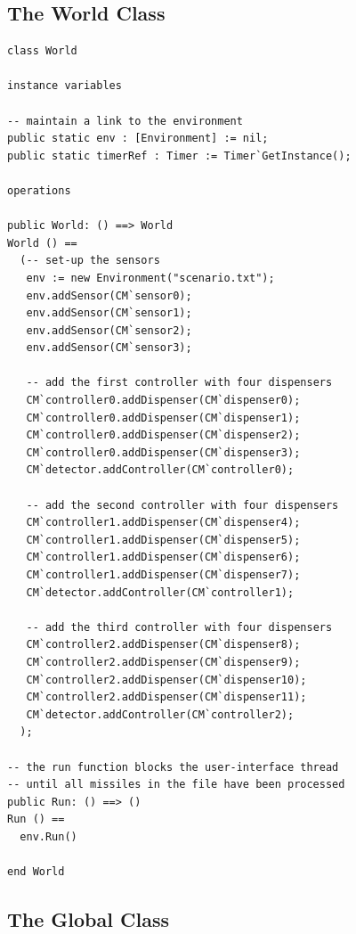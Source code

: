 \documentclass{overturerepchap}
\begin{document}
\subsection{The World Class}

\begin{lstlisting}
class World

instance variables
  
-- maintain a link to the environment
public static env : [Environment] := nil;
public static timerRef : Timer := Timer`GetInstance();

operations

public World: () ==> World
World () ==
  (-- set-up the sensors
   env := new Environment("scenario.txt");
   env.addSensor(CM`sensor0);
   env.addSensor(CM`sensor1);
   env.addSensor(CM`sensor2);
   env.addSensor(CM`sensor3);

   -- add the first controller with four dispensers
   CM`controller0.addDispenser(CM`dispenser0);
   CM`controller0.addDispenser(CM`dispenser1);
   CM`controller0.addDispenser(CM`dispenser2);
   CM`controller0.addDispenser(CM`dispenser3);
   CM`detector.addController(CM`controller0);

   -- add the second controller with four dispensers
   CM`controller1.addDispenser(CM`dispenser4);
   CM`controller1.addDispenser(CM`dispenser5);
   CM`controller1.addDispenser(CM`dispenser6);
   CM`controller1.addDispenser(CM`dispenser7);
   CM`detector.addController(CM`controller1);
 
   -- add the third controller with four dispensers
   CM`controller2.addDispenser(CM`dispenser8);
   CM`controller2.addDispenser(CM`dispenser9);
   CM`controller2.addDispenser(CM`dispenser10);
   CM`controller2.addDispenser(CM`dispenser11);
   CM`detector.addController(CM`controller2);
  );

-- the run function blocks the user-interface thread
-- until all missiles in the file have been processed
public Run: () ==> ()
Run () == 
  env.Run()

end World
\end{lstlisting}

\subsection{The Global Class}
\end{document}
